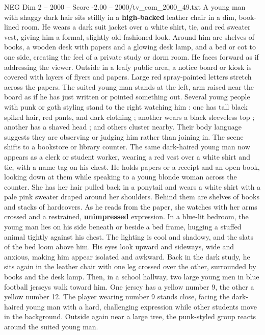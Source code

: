 \begin{textsample}{NEG Dim 2 – 2000 – Score -2.00 – 2000/tv\_com\_2000\_49.txt}  \label{ex:f2_neg_073}
A young man with shaggy dark hair sits stiffly in a \textbf{high-backed} leather chair in a dim, book-lined room.
He wears a dark suit jacket over a white shirt, tie, and red sweater vest, giving him a formal, slightly old-fashioned look.
Around him are shelves of books, a wooden desk with papers and a glowing desk lamp, and a bed or cot to one side, creating the feel of a private study or dorm room.
He faces forward as if addressing the viewer.
Outside in a leafy public area, a notice board or kiosk is covered with layers of flyers and papers.
Large red spray-painted letters stretch across the papers.
The suited young man stands at the left, arm raised near the board as if he has just written or pointed something out.
Several young people with punk or goth styling stand to the right watching him : one has tall black spiked hair, red pants, and dark clothing ; another wears a black sleeveless top ; another has a shaved head ; and others cluster nearby.
Their body language suggests they are observing or judging him rather than joining in.
The scene shifts to a bookstore or library counter.
The same dark-haired young man now appears as a clerk or student worker, wearing a red vest over a white shirt and tie, with a name tag on his chest.
He holds papers or a receipt and an open book, looking down at them while speaking to a young blonde woman across the counter.
She has her hair pulled back in a ponytail and wears a white shirt with a pale pink sweater draped around her shoulders.
Behind them are shelves of books and stacks of hardcovers.
As he reads from the paper, she watches with her arms crossed and a restrained, \textbf{unimpressed} expression.
In a blue-lit bedroom, the young man lies on his side beneath or beside a bed frame, hugging a stuffed animal tightly against his chest.
The lighting is cool and shadowy, and the slats of the bed loom above him.
His eyes look upward and sideways, wide and anxious, making him appear isolated and awkward.
Back in the dark study, he sits again in the leather chair with one leg crossed over the other, surrounded by books and the desk lamp.
Then, in a school hallway, two large young men in blue football jerseys walk toward him.
One jersey has a yellow number 9, the other a yellow number 12.
The player wearing number 9 stands close, facing the dark-haired young man with a hard, challenging expression while other students move in the background.
Outside again near a large tree, the punk-styled group reacts around the suited young man.

\end{textsample}
